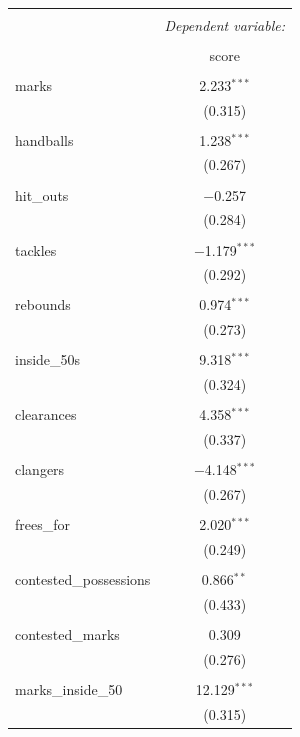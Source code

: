 \documentclass{article}
\begin{document}
\begin{table}[!htbp] \centering 
  \caption{} 
  \label{} 
\begin{tabular}{@{\extracolsep{5pt}}lc} 
\\[-1.8ex]\hline 
\hline \\[-1.8ex] 
 & \multicolumn{1}{c}{\textit{Dependent variable:}} \\ 
\cline{2-2} 
\\[-1.8ex] & score \\ 
\hline \\[-1.8ex] 
 marks & 2.233$^{***}$ \\ 
  & (0.315) \\ 
  & \\ 
 handballs & 1.238$^{***}$ \\ 
  & (0.267) \\ 
  & \\ 
 hit\_outs & $-$0.257 \\ 
  & (0.284) \\ 
  & \\ 
 tackles & $-$1.179$^{***}$ \\ 
  & (0.292) \\ 
  & \\ 
 rebounds & 0.974$^{***}$ \\ 
  & (0.273) \\ 
  & \\ 
 inside\_50s & 9.318$^{***}$ \\ 
  & (0.324) \\ 
  & \\ 
 clearances & 4.358$^{***}$ \\ 
  & (0.337) \\ 
  & \\ 
 clangers & $-$4.148$^{***}$ \\ 
  & (0.267) \\ 
  & \\ 
 frees\_for & 2.020$^{***}$ \\ 
  & (0.249) \\ 
  & \\ 
 contested\_possessions & 0.866$^{**}$ \\ 
  & (0.433) \\ 
  & \\ 
 contested\_marks & 0.309 \\ 
  & (0.276) \\ 
  & \\ 
 marks\_inside\_50 & 12.129$^{***}$ \\ 
  & (0.315) \\ 

\end{tabular}
\end{table}
\end{document}
